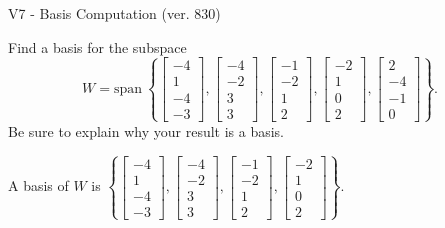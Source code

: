 \begin{exercise}
  \begin{exerciseTitle}V7 - Basis Computation (ver. 830)\end{exerciseTitle}
  \begin{exerciseStatement}
    Find a basis for the subspace 
\[W=\mathrm{span}\ \left\{\left[\begin{array}{r}
-4 \\
1 \\
-4 \\
-3
\end{array}\right] , \left[\begin{array}{r}
-4 \\
-2 \\
3 \\
3
\end{array}\right] , \left[\begin{array}{r}
-1 \\
-2 \\
1 \\
2
\end{array}\right] , \left[\begin{array}{r}
-2 \\
1 \\
0 \\
2
\end{array}\right] , \left[\begin{array}{r}
2 \\
-4 \\
-1 \\
0
\end{array}\right]\right\}.\]
 Be sure to explain why your result is a basis.


  \end{exerciseStatement}
  \begin{exerciseAnswer}
   A basis of \(W\) is  \(\left\{\left[\begin{array}{r}
-4 \\
1 \\
-4 \\
-3
\end{array}\right] , \left[\begin{array}{r}
-4 \\
-2 \\
3 \\
3
\end{array}\right] , \left[\begin{array}{r}
-1 \\
-2 \\
1 \\
2
\end{array}\right] , \left[\begin{array}{r}
-2 \\
1 \\
0 \\
2
\end{array}\right]\right\}\).
  


  \end{exerciseAnswer}
\end{exercise}